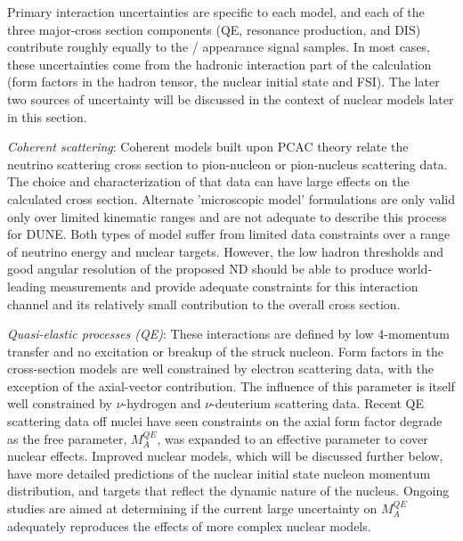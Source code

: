 Primary interaction uncertainties are specific to each model, and each of the three major-cross 
section components (QE, resonance production, and DIS) contribute roughly equally to the \nue/\anue
appearance signal samples. In most cases, these uncertainties come from the hadronic interaction part of the
calculation (form factors in the hadron tensor, the nuclear initial state and FSI). 
The later two sources of uncertainty will be discussed in the context of nuclear models later in this
section. 

  \emph{Coherent scattering}: Coherent models built upon PCAC theory relate the neutrino scattering 
  cross section to pion-nucleon or pion-nucleus scattering data. The choice and characterization
  of that data can have large effects on the calculated cross section. Alternate 'microscopic model' 
  formulations are only valid only over limited kinematic ranges and are not adequate to describe this process 
  for DUNE. Both types of model suffer from limited data constraints over a range of neutrino energy
  and nuclear targets.
  However, the low hadron thresholds and good angular resolution of the proposed ND should be able
  to produce world-leading measurements and provide adequate constraints for this interaction channel and 
  its relatively small contribution to the overall cross section.

  \emph{Quasi-elastic processes (QE)}: These interactions are defined by low 4-momentum transfer and no excitation
  or breakup of the struck nucleon. Form factors in the cross-section models are well constrained by 
  electron scattering data, with the exception of the axial-vector contribution. The influence of this 
  parameter is itself well constrained by $\nu$-hydrogen and $\nu$-deuterium scattering data. Recent QE
  scattering data off nuclei have seen constraints on the axial form factor degrade as the free
  parameter, $M_{A}^{QE}$, was expanded to an effective parameter to cover nuclear effects. 
  Improved nuclear models, which will be discussed further below, have more detailed predictions
  of the nuclear initial state nucleon momentum distribution, and targets that reflect the dynamic
  nature of the nucleus. Ongoing studies are aimed at determining if the current large uncertainty 
  on $M_{A}^{QE}$ adequately reproduces the effects of more complex nuclear models.

